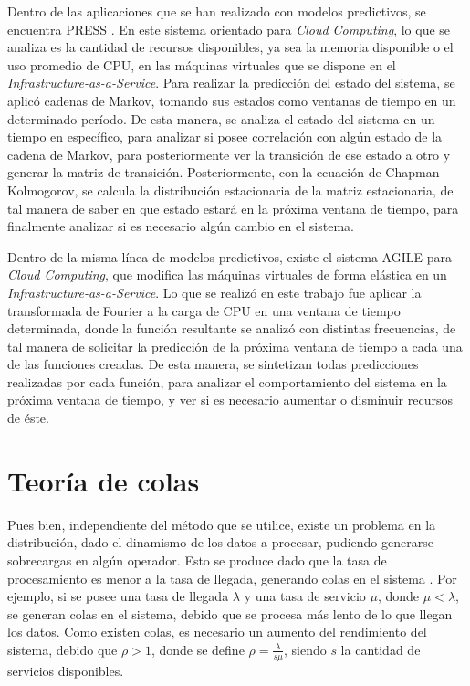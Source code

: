 Dentro de las aplicaciones que se han realizado con modelos predictivos, se encuentra PRESS \citep{GongGW10}. En este sistema orientado para \textit{Cloud Computing}, lo que se analiza es la cantidad de recursos disponibles, ya sea la memoria disponible o el uso promedio de CPU, en las máquinas virtuales que se dispone en el \textit{Infrastructure-as-a-Service}. Para realizar la predicción del estado del sistema, se aplicó cadenas de Markov, tomando sus estados como ventanas de tiempo en un determinado período. De esta manera, se analiza el estado del sistema en un tiempo en específico, para analizar si posee correlación con algún estado de la cadena de Markov, para posteriormente ver la transición de ese estado a otro y generar la matriz de transición. Posteriormente, con la ecuación de Chapman-Kolmogorov, se calcula la distribución estacionaria de la matriz estacionaria, de tal manera de saber en que estado estará en la próxima ventana de tiempo, para finalmente analizar si es necesario algún cambio en el sistema.

Dentro de la misma línea de modelos predictivos, existe el sistema AGILE \citep{NguyenSGSW13} para \textit{Cloud Computing}, que modifica las máquinas virtuales de forma elástica en un \textit{Infrastructure-as-a-Service}. Lo que se realizó en este trabajo fue aplicar la transformada de Fourier \citep{falk2012first} a la carga de CPU en una ventana de tiempo determinada, donde la función resultante se analizó con distintas frecuencias, de tal manera de solicitar la predicción de la próxima ventana de tiempo a cada una de las funciones creadas. De esta manera, se sintetizan todas predicciones realizadas por cada función, para analizar el comportamiento del sistema en la próxima ventana de tiempo, y ver si es necesario aumentar o disminuir recursos de éste.

\section{Teoría de colas}

Pues bien, independiente del método que se utilice, existe un problema en la distribución, dado el dinamismo de los datos a procesar, pudiendo generarse sobrecargas en algún operador. Esto se produce dado que la tasa de procesamiento es menor a la tasa de llegada, generando colas en el sistema \citep{queueingtheory}. Por ejemplo, si se posee una tasa de llegada $\lambda$ y una tasa de servicio $\mu$, donde $\mu < \lambda$, se generan colas en el sistema, debido que se procesa más lento de lo que llegan los datos. Como existen colas, es necesario un aumento del rendimiento del sistema, debido que $\rho > 1 $, donde se define $\rho = \frac{\lambda}{s\mu}$, siendo $s$ la cantidad de servicios disponibles.
